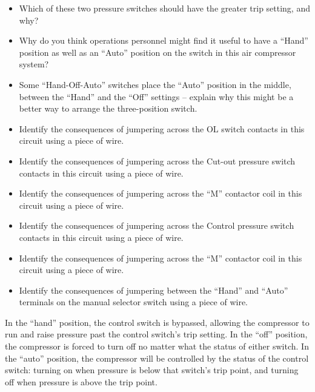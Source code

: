 \begin{itemize}
\item{} Which of these two pressure switches should have the greater trip setting, and why?
\item{} Why do you think operations personnel might find it useful to have a ``Hand'' position as well as an ``Auto'' position on the switch in this air compressor system?
\item{} Some ``Hand-Off-Auto'' switches place the ``Auto'' position in the middle, between the ``Hand'' and the ``Off'' settings -- explain why this might be a better way to arrange the three-position switch.
\item{} Identify the consequences of jumpering across the OL switch contacts in this circuit using a piece of wire.
\item{} Identify the consequences of jumpering across the Cut-out pressure switch contacts in this circuit using a piece of wire.
\item{} Identify the consequences of jumpering across the ``M'' contactor coil in this circuit using a piece of wire.
\item{} Identify the consequences of jumpering across the Control pressure switch contacts in this circuit using a piece of wire.
\item{} Identify the consequences of jumpering across the ``M'' contactor coil in this circuit using a piece of wire.
\item{} Identify the consequences of jumpering between the ``Hand'' and ``Auto'' terminals on the manual selector switch using a piece of wire.
\end{itemize}














In the ``hand'' position, the control switch is bypassed, allowing the compressor to run and raise pressure past the control switch's trip setting.  In the ``off'' position, the compressor is forced to turn off no matter what the status of either switch.  In the ``auto'' position, the compressor will be controlled by the status of the control switch: turning on when pressure is below that switch's trip point, and turning off when pressure is above the trip point.


